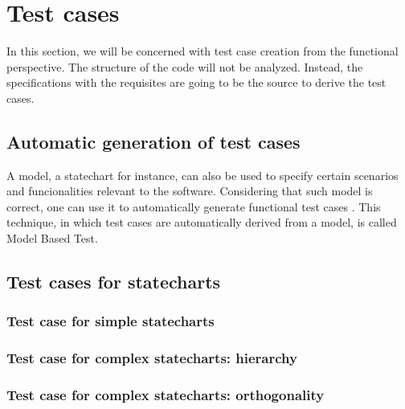 \chapter{Test cases}
\label{cap:testgen}

In this section, we will be concerned with test case creation from the functional perspective. The structure of the code will not be analyzed. Instead, the specifications with the requisites are going to be the source to derive the test cases.



\section{Automatic generation of test cases}

A model, a statechart for instance, can also be used to specify certain scenarios and funcionalities relevant to the software. Considering that such model is correct, one can use it to automatically generate functional test cases \cite{Maldonado:07}. This technique, in which test cases are automatically derived from a model, is called Model Based Test.



\section{Test cases for statecharts}

\subsection{Test case for simple statecharts}

\subsection{Test case for complex statecharts: hierarchy}

\subsection{Test case for complex statecharts: orthogonality}
